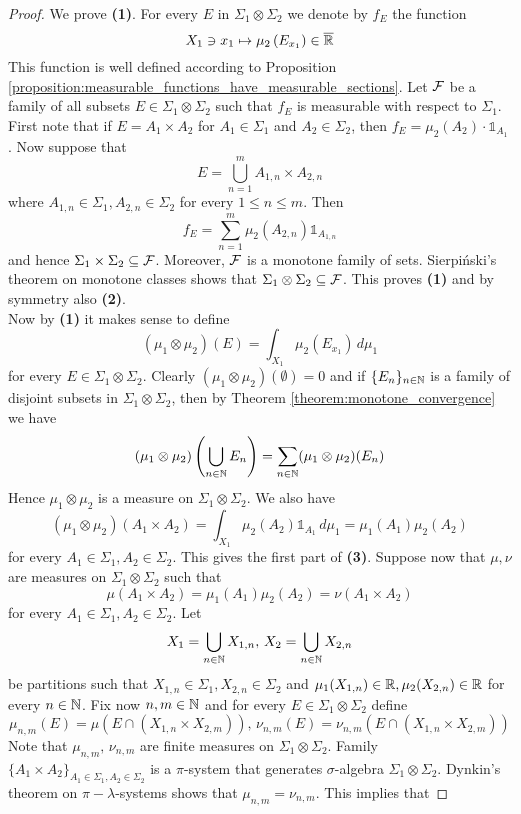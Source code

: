 \begin{proof}
We prove \textbf{(1)}. For every $E$ in $\Sigma_1\otimes \Sigma_2$ we denote by $f_E$ the function
$$X_1\ni x_1 \mapsto \mu_2\left(E_{x_1}\right)\in \overline{{\mathbb R}}$$
This function is well defined according to Proposition \ref{proposition:measurable_functions_have_measurable_sections}. Let ${\mathcal F}$ be a family of all subsets $E\in \Sigma_1\otimes \Sigma_2$ such that $f_E$ is measurable with respect to $\Sigma_1$. First note that if $E=A_1 \times A_2$ for $A_1\in \Sigma_1$ and $A_2\in \Sigma_2$, then  $f_E = \mu_2(A_2)\cdot \mathbb{1}_{A_1}$. Now suppose that
$$E= \bigcup_{n=1}^mA_{1,n}\times A_{2,n}$$
where $A_{1,n}\in \Sigma_1,A_{2,n}\in \Sigma_2$ for every $1\leq n\leq m$. Then
$$f_E = \sum_{n=1}^m\mu_2(A_{2,n})\mathbb{1}_{A_{1,n}}$$
and hence $\Sigma_1\times \Sigma_2\subseteq {\mathcal F}$. Moreover, ${\mathcal F}$ is a monotone family of sets. Sierpiński's theorem on monotone classes shows that $\Sigma_1\otimes \Sigma_2\subseteq {\mathcal F}$. This proves \textbf{(1)} and by symmetry also \textbf{(2)}.\\ Now by \textbf{(1)} it makes sense to define
$$(\mu_1\otimes \mu_2)(E) = \int_{X_1}\mu_2(E_{x_1})\,d\mu_1$$
for every $E\in \Sigma_1\otimes \Sigma_2$. Clearly $(\mu_1\otimes \mu_2)(\emptyset) = 0$ and if $\{E_n\}_{n\in {\mathbb N}}$ is a family of disjoint subsets in $\Sigma_1\otimes \Sigma_2$, then by Theorem \ref{theorem:monotone_convergence} we have
$$(\mu_1\otimes \mu_2)\left(\bigcup_{n\in {\mathbb N}}E_n\right) = \sum_{n\in {\mathbb N}}(\mu_1\otimes \mu_2)(E_n)$$
Hence $\mu_1\otimes \mu_2$ is a measure on $\Sigma_1\otimes \Sigma_2$. We also have
$$(\mu_1\otimes \mu_2)\left(A_1\times A_2\right) = \int_{X_1}\mu_2(A_2)\mathbb{1}_{A_1}\,d\mu_1 = \mu_1(A_1)\mu_2(A_2)$$
for every $A_1\in \Sigma_1, A_2\in \Sigma_2$. This gives the first part of \textbf{(3)}. Suppose now that $\mu,\nu$ are measures on $\Sigma_1\otimes \Sigma_2$ such that
$$\mu(A_1\times A_2) = \mu_1(A_1)\mu_2(A_2) = \nu(A_1\times A_2)$$
for every $A_1\in \Sigma_1,A_2\in \Sigma_2$. Let 
$$X_1 = \bigcup_{n\in {\mathbb N}}X_{1,n},\,X_2 = \bigcup_{n\in {\mathbb N}}X_{2,n}$$
be partitions such that $X_{1,n}\in \Sigma_1,X_{2,n}\in \Sigma_2$ and $\mu_1(X_{1,n})\in {\mathbb R},\mu_2(X_{2,n})\in {\mathbb R}$ for every $n\in {\mathbb N}$. Fix now $n,m\in {\mathbb N}$ and for every $E\in \Sigma_1\otimes \Sigma_2$ define
$$\mu_{n,m}(E) = \mu\left(E\cap (X_{1,n}\times  X_{2,m})\right),\,\nu_{n,m}(E) = \nu_{n,m}\left(E\cap (X_{1,n}\times X_{2,m})\right)$$
Note that $\mu_{n,m},\,\nu_{n,m}$ are finite measures on $\Sigma_1\otimes \Sigma_2$. Family $\big\{A_1\times A_2\big\}_{A_1\in \Sigma_1,A_2\in \Sigma_2}$ is a $\pi$-system that generates $\sigma$-algebra $\Sigma_1\otimes \Sigma_2$. Dynkin's theorem on $\pi-\lambda$-systems shows that $\mu_{n,m} = \nu_{n,m}$. This implies that

\end{proof}
